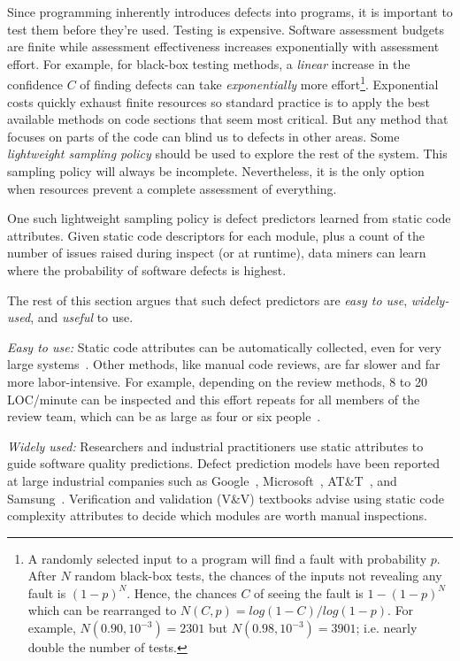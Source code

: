 Since programming inherently
introduces defects into  programs, it is important to test them before they're used.
Testing is expensive.
Software assessment budgets are finite
while assessment effectiveness increases 
exponentially with assessment effort.
For example, for  black-box testing methods,
a {\em linear} increase
in the confidence $C$ of finding  defects
can take {\em exponentially} more effort\footnote{A randomly selected 
input to a program will find a fault with probability $p$.
After $N$ random black-box tests, the chances of the inputs 
not revealing any fault 
is $(1-p)^N$. Hence, the chances $C$ of seeing the fault is $1-(1-p)^N$
which can be rearranged to 
 $N(C,p)=log(1 -
C)/log(1-p)$. For example, $N(0.90,10^{-3})=2301$
but $N(0.98,10^{-3})=3901$; i.e. nearly double the number of tests.}.
Exponential costs quickly exhaust finite resources so
standard practice is to apply the best
available  methods on code sections that seem most critical. 
But any method that focuses on parts of the code
can blind us to defects in other areas. Some  {\em lightweight sampling policy} should be used to explore the rest of the system.
This sampling policy will always be incomplete.
Nevertheless, it is the only option when
resources prevent a complete assessment of everything.

One such lightweight sampling policy is defect predictors learned from static code attributes.
Given static code descriptors for each module, plus a count of the number of issues raised during inspect (or at runtime),
data miners can
learn where the probability of software defects is highest.



The rest of this section argues that such defect predictors are   {\em easy to
use}, {\em widely-used}, and {\em useful} to use.

{\em Easy to use:} Static code attributes can be automatically collected, even for very large systems~\cite{nagappan05}.
Other methods, like  manual code reviews, are far slower and far more labor-intensive.
For example, depending on the review methods, 8 to 20 LOC/minute can be
inspected and this effort repeats for all members of the review team,
which can be as large as four or six people~\cite{me02f}. 

{\em Widely used:}  Researchers and industrial practitioners  use static attributes to guide software 
quality predictions.
 Defect prediction models have been reported
  at large industrial companies such as Google~\cite{lewis13}, Microsoft~\cite{Nagappan06}, AT\&T~\cite{Ostrand05}, and Samsung~\cite{Kim15remi}.
Verification and validation (V\&V) textbooks
\cite{rakitin01} advise using static code complexity attributes
to decide which modules are worth manual inspections. 


